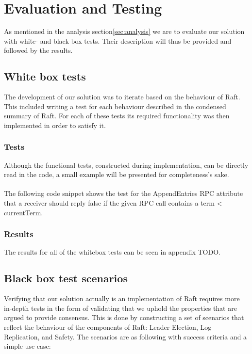 \section{Evaluation and Testing} %
\label{sec:evaluation_and_testing}
As mentioned in the analysis section\ref{sec:analysis} we are to evaluate our solution with white- and black box tests. Their description will thus be provided and followed by the results.

\subsection{White box tests}
The development of our solution was to iterate based on the behaviour of Raft. This included writing a test for each behaviour described in the condensed summary of Raft\cite{Raft}. For each of these tests its required functionality was then implemented in order to satisfy it.


\subsubsection{Tests}
Although the functional tests, constructed during implementation, can be directly read in the code, a small example will be presented for completeness's sake.\\ \\
The following code snippet shows the test for the AppendEntries RPC attribute that a receiver should reply false if the given RPC call contains a term < currentTerm.


\subsubsection{Results}
The results for all of the whitebox tests can be seen in appendix TODO.

\subsection{Black box test scenarios}
Verifying that our solution actually is an implementation of Raft requires more in-depth tests in the form of validating that we uphold the properties that are argued to provide consensus. This is done by constructing a set of scenarios that reflect the behaviour of the components of Raft: Leader Election, Log Replication, and Safety. The scenarios are as following with success criteria and a simple use case:

